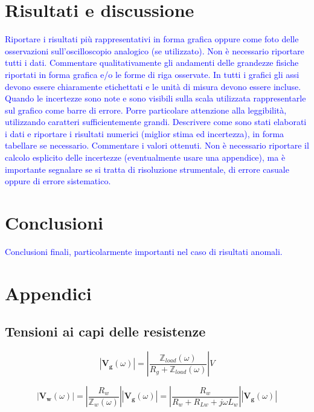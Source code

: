 \documentclass[12pt,italian]{article}
\newcommand{\prof}[1]{\textcolor{blue}{#1}}
\begin{document}
\section*{Risultati e discussione}
\prof{ Riportare i risultati più rappresentativi in forma grafica oppure come
  foto delle osservazioni sull'oscilloscopio analogico (se utilizzato). Non è
  necessario riportare tutti i dati. Commentare qualitativamente gli andamenti
  delle grandezze fisiche riportati in forma grafica e/o le forme di riga
  osservate. In tutti i grafici gli assi devono essere chiaramente etichettati e
  le unità di misura devono essere incluse. Quando le incertezze sono note e
  sono visibili sulla scala utilizzata rappresentarle sul grafico come barre di
  errore. Porre particolare attenzione alla leggibilità, utilizzando caratteri
  sufficientemente grandi. Descrivere come sono stati elaborati i dati e
  riportare i risultati numerici (miglior stima ed incertezza), in forma
  tabellare se necessario. Commentare i valori ottenuti. Non è necessario
  riportare il calcolo esplicito delle incertezze (eventualmente usare una
  appendice), ma è importante segnalare se si tratta di risoluzione strumentale,
  di errore casuale oppure di errore sistematico. }

\section*{Conclusioni}
\prof{Conclusioni finali, particolarmente importanti nel caso di risultati
  anomali.}

\appendix
\section{Appendici}
\subsection{Tensioni ai capi delle resistenze}
\label{sec:tensioni}
\begin{equation}
  \left| \mathbf{V_{g}}(\omega) \right| = \left| \frac{\mathbb{Z}_{load}(\omega)}
  {R_{g}+\mathbb{Z}_{load}(\omega)}\right|V
\end{equation}

\begin{equation}
  \left| \mathbf{V_{w}}(\omega) \right| = \left| \frac{R_{w}}
  {\mathbb{Z}_{w}(\omega)}\right|\left| \mathbf{V_{g}}(\omega) \right| = \left| \frac{R_{w}}
  {R_{w}+R_{Lw} + j \omega L_w}\right|\left| \mathbf{V_{g}}(\omega) \right|
\end{equation}
\end{document}
